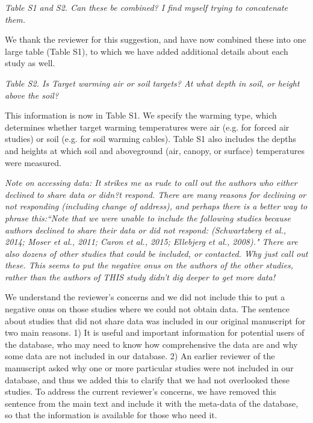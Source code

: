 \documentclass[11pt,a4paper]{letter}
\begin{document}
\begin{letter}{}
\par \emph{Table S1 and S2.  Can these be combined?  I find myself trying to concatenate them.}
\par We thank the reviewer for this suggestion, and have now combined these into one large table (Table S1), to which we have added additional details about each study as well.

\par \emph{Table S2.  Is Target warming air or soil targets?  At what depth in soil, or height above the soil?}

\par This information is now in Table S1. We specify the warming type, which determines whether target warming temperatures were air (e.g. for forced air studies) or soil (e.g. for soil warming cables). Table S1 also includes the depths and heights at which soil and aboveground (air, canopy, or surface) temperatures were measured. 

\par \emph{Note on accessing data:  It strikes me as rude to call out the authors who either declined to share data or didn?t respond.  There are many reasons for declining or not responding (including change of address), and perhaps there is a better way to phrase this:``Note that we were unable to include the following studies because authors declined to share their data or did not respond: (Schwartzberg et al., 2014; Moser et al., 2011; Caron et al., 2015; Ellebjerg et al., 2008)." There are also dozens of other studies that could be included, or contacted.  Why just call out these.  This seems to put the negative onus on the authors of the other studies, rather than the authors of THIS study didn't dig deeper to get more data!}

\par We understand the reviewer's concerns and we did not include this to put a negative onus on those studies where we could not obtain data.  The sentence about studies that did not share data was included in our original manuscript for two main reasons. 1) It is useful and important information for potential users of the database, who may need to know how comprehensive the data are and why some data are not included in our database. 2) An earlier reviewer of the manuscript asked why one or more particular studies were not included in our database, and thus we added this to clarify that we had not overlooked these studies. To address the current reviewer's concerns, we have removed this sentence from the main text and include it with the meta-data of the database, so that the information is available for those who need it.


\end{letter}
\end{document}
